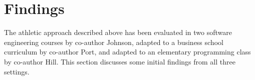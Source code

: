 \section{Findings}

The athletic approach described above has been evaluated in two software engineering courses by co-author Johnson, adapted to a business school curriculum by co-author Port, and adapted to an elementary programming class by co-author Hill.  This section discusses some initial findings from all three settings.




